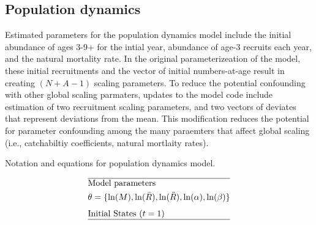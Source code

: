 \documentclass[12pt,letterpaper]{article}
\newcounter{saveEq}
\def\putEq{\setcounter{saveEq}{\value{equation}}}
\def\getEq{\setcounter{equation}{\value{saveEq}}}
\def\tableEq{ %
    \putEq \setcounter{equation}{0}
    \renewcommand{\theequation}{T\arabic{table}.\arabic{equation}}
    \vspace{-5mm}
    }
\def\normalEq{ %
    \getEq
    \renewcommand{\theequation}{\arabic{section}.\arabic{equation}}}
\begin{document}

  \subsection{Population dynamics} %
  \label{sub:population_dynamics}
  
  Estimated parameters for the population dynamics model include the initial abundance of ages 3-9+ for the intial year, abundance of age-3 recruits each year, and the natural mortality rate. In the original parameterizeation of the model, these initial recruitments and the vector of initial numbers-at-age result in creating $(N + A-1)$ scaling parameters.  To reduce the potential confounding with other global scaling parmaters, updates to the model code include estimation of two recruitment scaling parameters, and two vectors of deviates that represent deviations from the mean. This modification reduces the potential for parameter confounding among the many paraemters that affect global scaling (i.e., catchabiltiy coefficients, natural mortlaity rates).

  \begin{table}
    \centering
    \caption{Notation and equations for population dynamics model.}
    \label{tab:PopulationDynamics}
    \tableEq
    \begin{align}
      \hline \nonumber
      & \mbox{Model parameters} \nonumber\\
      & \theta = \{\ln(M),\ln(\bar{R}),\ln(\ddot{R}), 
        \ln(\alpha),\ln(\beta)\} \\[1ex]
      & \mbox{Initial States ($t=1$)} \nonumber \\
      \hline \nonumber
    \end{align}
    \normalEq
  \end{table}

\end{document}
